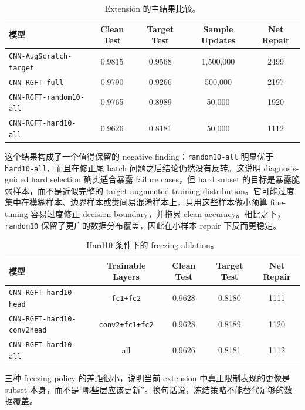 \documentclass[12pt,a4paper,fontset=fandol]{ctexart}
\begin{document}
\begin{table}[H]
  \centering
  \small
  \caption{Extension 的主结果比较。}
  \renewcommand{\arraystretch}{1.08}
  \begin{tabular}{lcccc}
    \toprule
    模型 & Clean Test & Target Test & Sample Updates & Net Repair \\
    \midrule
    \texttt{CNN-AugScratch-target} & 0.9815 & 0.9568 & 1{,}500{,}000 & 2499 \\
    \texttt{CNN-RGFT-full} & 0.9790 & 0.9266 & 500{,}000 & 2197 \\
    \texttt{CNN-RGFT-random10-all} & 0.9765 & 0.8989 & 50{,}000 & 1920 \\
    \texttt{CNN-RGFT-hard10-all} & 0.9626 & 0.8181 & 50{,}000 & 1112 \\
    \bottomrule
  \end{tabular}
\end{table}

这个结果构成了一个值得保留的 negative finding：\texttt{random10-all} 明显优于 \texttt{hard10-all}，而且在修正尾 batch 问题之后结论仍然没有反转。这说明 diagnosis-guided hard selection 确实适合暴露 failure cases，但 hard subset 的目标是暴露脆弱样本，而不是近似完整的 target-augmented training distribution。它可能过度集中在模糊样本、边界样本或类间易混淆样本上，只用这些样本做小预算 fine-tuning 容易过度修正 decision boundary，并拖累 clean accuracy。相比之下，\texttt{random10} 保留了更广的数据分布覆盖，因此在小样本 repair 下反而更稳定。

\begin{table}[H]
  \centering
  \small
  \caption{Hard10 条件下的 freezing ablation。}
  \renewcommand{\arraystretch}{1.08}
  \begin{tabular}{lcccc}
    \toprule
    模型 & Trainable Layers & Clean Test & Target Test & Net Repair \\
    \midrule
    \texttt{CNN-RGFT-hard10-head} & \texttt{fc1+fc2} & 0.9628 & 0.8180 & 1111 \\
    \texttt{CNN-RGFT-hard10-conv2head} & \texttt{conv2+fc1+fc2} & 0.9628 & 0.8189 & 1120 \\
    \texttt{CNN-RGFT-hard10-all} & all & 0.9626 & 0.8181 & 1112 \\
    \bottomrule
  \end{tabular}
\end{table}

三种 freezing policy 的差距很小，说明当前 extension 中真正限制表现的更像是 subset 本身，而不是“哪些层应该更新”。换句话说，冻结策略不能替代足够的数据覆盖。
\end{document}
